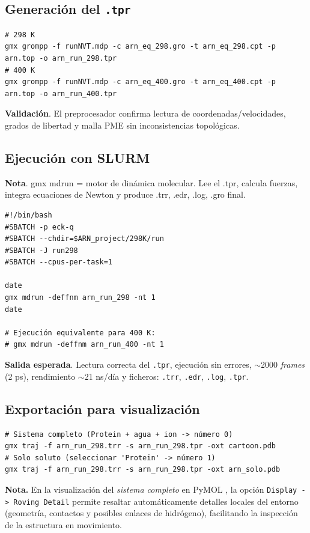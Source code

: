 \documentclass[12pt,a4paper]{article}
\begin{document}
\subsection{Generación del \texttt{.tpr}}
\begin{lstlisting}[style=bashstyle]
# 298 K
gmx grompp -f runNVT.mdp -c arn_eq_298.gro -t arn_eq_298.cpt -p arn.top -o arn_run_298.tpr
# 400 K
gmx grompp -f runNVT.mdp -c arn_eq_400.gro -t arn_eq_400.cpt -p arn.top -o arn_run_400.tpr
\end{lstlisting}
\textbf{Validación}. El preprocesador confirma lectura de coordenadas/velocidades, grados de libertad y malla PME sin inconsistencias topológicas.

\subsection{Ejecución con SLURM}
\noindent\textbf{Nota}. gmx mdrun = motor de dinámica molecular. Lee el .tpr, calcula fuerzas, integra ecuaciones de Newton y produce .trr, .edr, .log, .gro final.
\begin{lstlisting}[style=bashstyle]
#!/bin/bash
#SBATCH -p eck-q
#SBATCH --chdir=$ARN_project/298K/run
#SBATCH -J run298
#SBATCH --cpus-per-task=1

date
gmx mdrun -deffnm arn_run_298 -nt 1
date

# Ejecución equivalente para 400 K:
# gmx mdrun -deffnm arn_run_400 -nt 1
\end{lstlisting}
\textbf{Salida esperada}. Lectura correcta del \texttt{.tpr}, ejecución sin errores, \(\sim\)2000 \emph{frames} (2 ps), rendimiento \(\sim\)21 ns/día y ficheros: \texttt{.trr}, \texttt{.edr}, \texttt{.log}, \texttt{.tpr}.

\subsection{Exportación para visualización}
\begin{lstlisting}[style=bashstyle]
# Sistema completo (Protein + agua + ion -> número 0)
gmx traj -f arn_run_298.trr -s arn_run_298.tpr -oxt cartoon.pdb
# Solo soluto (seleccionar 'Protein' -> número 1)
gmx traj -f arn_run_298.trr -s arn_run_298.tpr -oxt arn_solo.pdb
\end{lstlisting}

\noindent\textbf{Nota.} En la visualización del \emph{sistema completo} en PyMOL , la opción \texttt{Display -> Roving Detail} permite resaltar automáticamente detalles locales del entorno (geometría, contactos y posibles enlaces de hidrógeno), facilitando la inspección de la estructura en movimiento.
\end{document}
